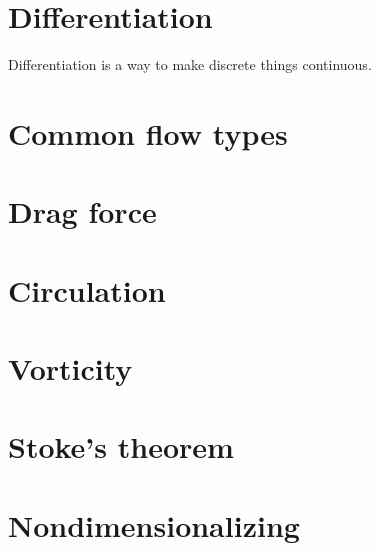\documentclass[10pt]{report}
\begin{document}







\chapter{Differentiation}

Differentiation is a way to make discrete things continuous.

\chapter{Common flow types}






\chapter{Drag force}





\chapter{Circulation}



\chapter{Vorticity}



\chapter{Stoke's theorem}



\chapter{Nondimensionalizing}
\end{document}
